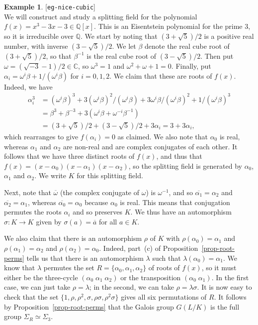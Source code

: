 \documentclass{amsart}
\newcommand{\lbl}[1]{\label{#1}\textup{[\texttt{#1}]}\ \\}
\newcommand{\lbl}{\label}
\newcommand{\Q}         {{\mathbb{Q}}}
\newcommand{\C}         {{\mathbb{C}}}
\newcommand{\al}        {\alpha}
\newcommand{\bt}        {\beta}
\newcommand{\lm}        {\lambda}
\newcommand{\sg}        {\sigma}
\newcommand{\om}        {\omega}
\newcommand{\Sg}        {\Sigma}
\newcommand{\ov}[1]     {\overline{#1}}
\renewcommand{\:}{\colon}
\theoremstyle{definition}
\newtheorem{example}[theorem]{Example}
\begin{document}
\begin{example}\lbl{eg-nice-cubic}
 We will construct and study a splitting field for the polynomial
 $f(x)=x^3-3x-3\in\Q[x]$.  This is an Eisentstein polynomial for the
 prime $3$, so it is irreducible over $\Q$.  We start by noting that
 $(3+\sqrt{5})/2$ is a positive real number, with inverse
 $(3-\sqrt{5})/2$.  We let $\bt$ denote the real cube root of
 $(3+\sqrt{5})/2$, so that $\bt^{-1}$ is the real cube root of
 $(3-\sqrt{5})/2$.  Then put $\om=(\sqrt{-3}-1)/2\in\C$, so $\om^3=1$
 and $\om^2+\om+1=0$.  Finally, put $\al_i=\om^i\bt+1/(\om^i\bt)$ for
 $i=0,1,2$.  We claim that these are roots of $f(x)$.  Indeed, we have
 \begin{align*}
  \al_i^3 &= (\om^i\bt)^3 + 3(\om^i\bt)^2/(\om^i\bt) +
              3\om^i\bt/(\om^i\bt)^2 + 1/(\om^i\bt)^3 \\
   &= \bt^3 + \bt^{-3} + 3(\om^i\bt+\om^{-i}\bt^{-1}) \\
   &= (3+\sqrt{5})/2 + (3-\sqrt{5})/2 + 3\al_i = 3+3\al_i,
 \end{align*}
 which rearranges to give $f(\al_i)=0$ as claimed.  We also note that
 $\al_0$ is real, whereas $\al_1$ and $\al_2$ are non-real and are
 complex conjugates of each other.  It follows that we have three
 distinct roots of $f(x)$, and thus that
 $f(x)=(x-\al_0)(x-\al_1)(x-\al_2)$, so the splitting field is
 generated by $\al_0$, $\al_1$ and $\al_2$.  We write $K$ for this
 splitting field.

 Next, note that $\ov{\om}$ (the complex conjugate of $\om$) is
 $\om^{-1}$, and so $\ov{\al_1}=\al_2$ and $\ov{\al_2}=\al_1$, whereas
 $\ov{\al_0}=\al_0$ because $\al_0$ is real.  This means that
 conjugation permutes the roots $\al_i$ and so preserves $K$.  We thus
 have an automorphism $\sg\:K\to K$ given by $\sg(a)=\ov{a}$ for all
 $a\in K$.  

 We also claim that there is an automorphism $\rho$ of $K$ with
 $\rho(\al_0)=\al_1$ and $\rho(\al_1)=\al_2$ and $\rho(\al_2)=\al_0$.
 Indeed, part~(c) of Proposition~\ref{prop-root-perms} tells us that
 there is an automorphism $\lm$ such that $\lm(\al_0)=\al_1$.  We
 know that $\lm$ permutes the set $R=\{\al_0,\al_1,\al_2\}$ of roots of
 $f(x)$, so it must either be the three-cycle $(\al_0\;\al_1\;\al_2)$
 or the transposition $(\al_0\;\al_1)$.  In the first case, we can
 just take $\rho=\lm$; in the second, we can take $\rho=\lm\sg$.  It
 is now easy to check that the set
 $\{1,\rho,\rho^2,\sg,\rho\sg,\rho^2\sg\}$ gives all six permutations
 of $R$.  It follows by Proposition~\ref{prop-root-perms} that the
 Galois group $G(L/K)$ is the full group $\Sg_R\simeq\Sg_3$.
\end{example}
\end{document}
